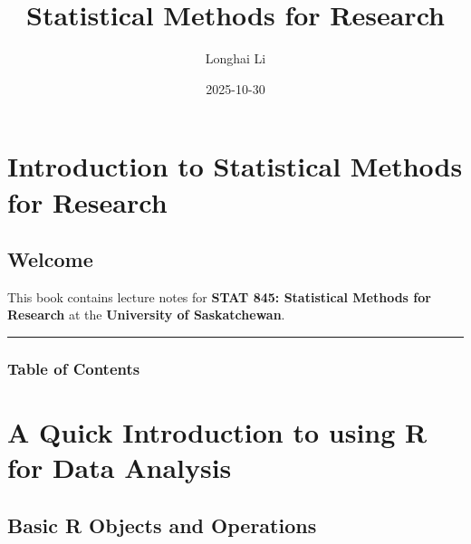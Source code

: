 \documentclass[
  letterpaper,
]{scrbook}
\title{Statistical Methods for Research}
\author{Longhai Li}
\date{2025-10-30}
\renewcommand*\contentsname{Table of contents}
\newcommand\contentsname{Table of contents}
\begin{document}
\frontmatter
\maketitle

\renewcommand*\contentsname{Table of contents}
{
\hypersetup{linkcolor=}
\setcounter{tocdepth}{2}
\tableofcontents
}

\mainmatter
{}

\chapter{Introduction to Statistical Methods for
Research}\label{introduction-to-statistical-methods-for-research}

\section*{Welcome}\label{welcome}


This book contains lecture notes for \textbf{STAT 845: Statistical
Methods for Research} at the \textbf{University of Saskatchewan}.

\begin{center}\rule{0.5\linewidth}{0.5pt}\end{center}

\subsection*{Table of Contents}\label{table-of-contents}

\label{book-toc}


\chapter{A Quick Introduction to using R for Data
Analysis}\label{a-quick-introduction-to-using-r-for-data-analysis}

\section{Basic R Objects and
Operations}\label{basic-r-objects-and-operations}
\end{document}
